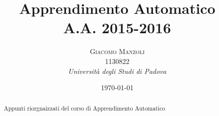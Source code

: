 \documentclass[a4paper, 11pt]{article} %
\title{\textbf{Apprendimento Automatico}\\ %
A.A. 2015-2016} %
\author{\textsc{Giacomo Manzoli}
\\ 1130822 %
\\{\textit{Università degli Studi di Padova}}} %
\date{\today} %
\makeatletter
\renewcommand{\maketitle}{ %
\begin{flushright} %
{\LARGE\@title} %

\vspace{50pt} %

{\large\@author} %
\\\@date %

\vspace{100pt} %
\end{flushright}
}
\makeatother
\begin{document}
\maketitle %



\begin{abstract}
Appunti riorgnaizzati del corso di Apprendimento Automatico

\end{abstract}

\clearpage
\tableofcontents


\vspace{30pt} %

\clearpage


















%
%
\end{document}
